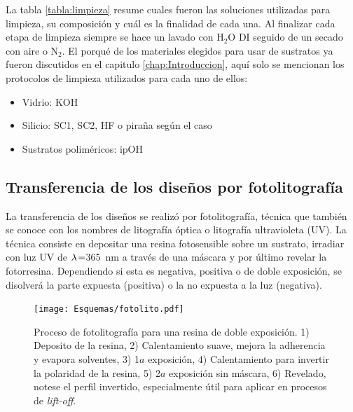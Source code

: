 							
			La tabla \ref{tabla:limpieza} resume cuales fueron las soluciones utilizadas para limpieza, su composición y cuál es la finalidad de cada una. Al finalizar cada etapa de limpieza siempre se hace un lavado con H$_2$O DI seguido de un secado con aire o N$_2$. El porqué de los materiales elegidos para usar de sustratos ya fueron discutidos en el capitulo \ref{chap:Introduccion}, aquí solo se mencionan los protocolos de limpieza\cite{Franssila2004,Kern1990} utilizados para cada uno de ellos:

				\begin{itemize}
					\item{Vidrio: KOH}
					\item{Silicio: SC1, SC2, HF o piraña según el caso}
					\item{Sustratos poliméricos: ipOH}
				\end{itemize}

    \subsection{Transferencia de los diseños por fotolitografía}\label{sec:fotolito}

		La transferencia de los diseños se realizó por fotolitografía, técnica que también se conoce con los nombres de litografía óptica o litografía ultravioleta (UV). La técnica consiste en depositar una resina fotosensible sobre un sustrato, irradiar con luz UV de $\lambda\index{longitud de onda}\!=$\SI{365}{nm} a través de una máscara y por último revelar la fotorresina. Dependiendo si esta es negativa, positiva o de doble exposición, se disolverá la parte expuesta (positiva) o la no expuesta a la luz (negativa). \cite{Jaeger2001,Franssila2004,Mack2007,Mack2006}
				

			  \begin{figure}[b!]
			  \begin{center}
			  \texttt{[image: Esquemas/fotolito.pdf]}
			  \caption[Esquema fotolitografía]{Proceso de fotolitografía para una resina de doble exposición. 1) Deposito de la resina, 2) Calentamiento suave, mejora la adherencia y evapora solventes, 3) 1$a$ exposición, 4) Calentamiento para invertir la polaridad de la resina, 5) 2$a$ exposición sin máscara, 6) Revelado, notese el perfil invertido, especialmente útil para aplicar en procesos de\textit{ lift-off}.}
			  \label{esq:fotolito}
			  \end{center}
			  \end{figure}	

